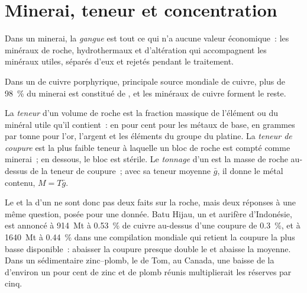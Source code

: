 \section{Minerai, teneur et concentration}\label{sec:b2:ore-deposits:grade}

\begin{definition}[Gangue]\label{def:b2:ore-deposits:ore}
Dans un minerai, la \emph{gangue} est tout ce qui n'a aucune valeur économique~: les
minéraux de roche, hydrothermaux et d'altération qui accompagnent les minéraux utiles, séparés
d'eux et rejetés pendant le traitement.
\end{definition}

Dans un  de cuivre porphyrique, principale source mondiale de cuivre, plus de
\qty{98}{\percent} du minerai est constitué de , et les minéraux de cuivre forment le reste.

\begin{definition}\label{def:b2:ore-deposits:grade}
La \emph{teneur} d'un volume de roche est la fraction massique de l'élément ou du
minéral utile qu'il contient~: en pour cent pour les métaux de base, en grammes par tonne pour l'or,
l'argent et les éléments du groupe du platine. La \emph{teneur de coupure}
est la plus faible teneur à laquelle un bloc de roche est compté comme minerai~; en dessous, le bloc
est stérile. Le \emph{tonnage} d'un  est la masse de roche au-dessus de la
teneur de coupure~; avec sa teneur moyenne $\bar g$, il donne le métal contenu, $M = T\bar g$.
\end{definition}

Le  et la  d'un  ne sont donc pas deux faits sur la roche, mais deux réponses
à une même question, posée pour une  donnée. Batu Hijau, un  et aurifère d'Indonésie, est annoncé à \qty{914}{Mt} à \qty{0.53}{\percent} de cuivre
au-dessus d'une coupure de \qty{0.3}{\percent}, et à \qty{1640}{Mt} à \qty{0.44}{\percent} dans une
compilation mondiale qui retient la coupure la plus basse disponible~: abaisser la coupure presque
double le  et abaisse la  moyenne. Dans un  sédimentaire zinc--plomb, le
 de Tom, au Canada, une baisse de la  d'environ un pour cent de zinc et de plomb réunis multiplierait les réserves par cinq.

